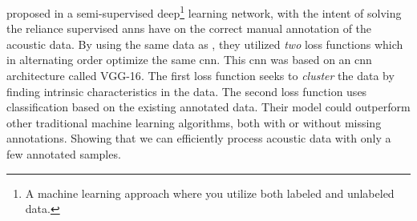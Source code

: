 \citet{semtantic-segm2021choi} proposed in \citeyear{semtantic-segm2021choi} a semi-supervised deep\footnote{A machine learning approach where you utilize both labeled and unlabeled data\cite{Goodfellow-et-al-2016}.} learning network, with the intent of solving the reliance supervised \gls{ann}s have on the correct manual annotation of the acoustic data. By using the same data as \citet{brautaset2020acoustic}, they utilized \textit{two} loss functions which in alternating order optimize the same \gls{cnn}. This \gls{cnn} was based on an \gls{cnn} architecture called VGG-16\cite{simonyan2014very}. The first loss function seeks to \textit{cluster} the data by finding intrinsic characteristics in the data. The second loss function uses classification based on the existing annotated data. Their model could outperform other traditional machine learning algorithms, both with or without missing annotations. Showing that we can efficiently process acoustic data with only a few annotated samples.





%        









        
        
        
        
        

        
        
        
        
        
        
 



